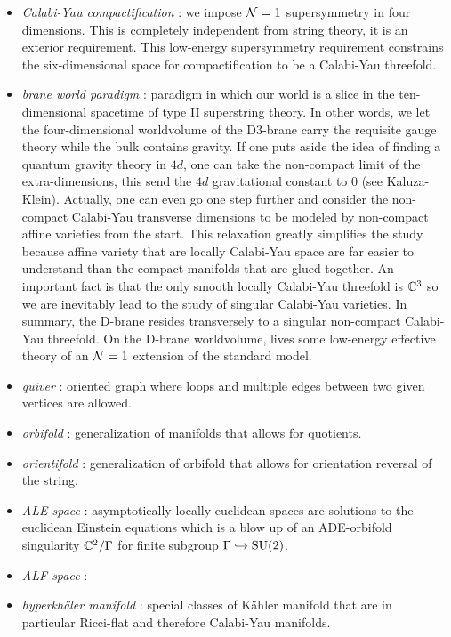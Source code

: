 \documentclass[a4paper,8pt]{article}
\begin{document}
    \begin{itemize}
        \item \emph{Calabi-Yau compactification} : we impose $\mathcal{N}=1$ supersymmetry in four dimensions. This is completely independent from string theory, it is an exterior requirement. This low-energy supersymmetry requirement constrains the six-dimensional space for compactification to be a Calabi-Yau threefold.
        \item \emph{brane world paradigm} : paradigm in which our world is a slice in the ten-dimensional spacetime of type II superstring theory. In other words, we let the four-dimensional worldvolume  of the D3-brane carry the requisite gauge theory while the bulk contains gravity. If one puts aside the idea of finding a quantum gravity theory in $4d$, one can take the non-compact limit of the extra-dimensions, this send the $4d$ gravitational constant to $0$ (see Kaluza-Klein). Actually, one can even go one step further and consider the non-compact Calabi-Yau transverse dimensions to be modeled by non-compact affine varieties from the start. This relaxation greatly simplifies the study because affine variety that are locally Calabi-Yau space are far easier to understand than the compact manifolds that are glued together. An important fact is that the only smooth locally Calabi-Yau threefold is $\mathbb{C}^3$ so we are inevitably lead to the study of singular Calabi-Yau varieties. In summary, the D-brane resides transversely to a singular non-compact Calabi-Yau threefold. On the D-brane worldvolume, lives some low-energy effective theory of an $\mathcal{N}=1$ extension of the standard model.
        \item \emph{quiver} : oriented graph where loops and multiple edges between two given vertices are allowed.
        \item \emph{orbifold} : generalization of manifolds that allows for quotients.
        \item \emph{orientifold} : generalization of orbifold that allows for orientation reversal of the string.
        \item \emph{ALE space} : asymptotically locally euclidean spaces are solutions to the euclidean Einstein equations which is a blow up of an ADE-orbifold singularity $\mathbb{C}^2/\Gamma$ for finite subgroup $\Gamma\hookrightarrow\text{SU}(2)$.
        \item \emph{ALF space} :
        \item \emph{hyperkhäler manifold} : special classes of Kähler manifold that are in particular Ricci-flat and therefore Calabi-Yau manifolds.

\end{itemize}
\end{document}
